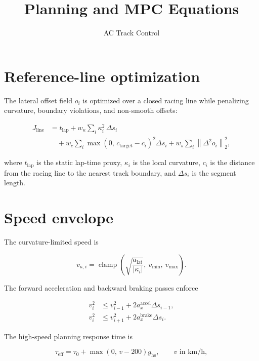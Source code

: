 \documentclass[9pt]{article}
\title{\vspace{-1.0cm}\textbf{Planning and MPC Equations}}
\author{AC Track Control}
\date{}
\begin{document}
\maketitle
\vspace{-0.5cm}
\small
{}

\section{Reference-line optimization}

The lateral offset field $o_i$ is optimized over a closed racing line while
penalizing curvature, boundary violations, and non-smooth offsets:

\begin{align}
J_{\mathrm{line}}
&= t_{\mathrm{lap}}
+ w_{\kappa}\sum_i \kappa_i^2\,\Delta s_i \nonumber\\
&\quad
+ w_c\sum_i
\max\!\left(0,\,c_{\mathrm{target}}-c_i\right)^2\Delta s_i
+ w_s\sum_i \left\|\Delta^2 o_i\right\|_2^2,
\label{eq:line-cost}
\end{align}

where $t_{\mathrm{lap}}$ is the static lap-time proxy, $\kappa_i$ is the local
curvature, $c_i$ is the distance from the racing line to the nearest track
boundary, and $\Delta s_i$ is the segment length.

\section{Speed envelope}

The curvature-limited speed is

\begin{equation}
v_{\kappa,i}
=
\operatorname{clamp}\!\left(
\sqrt{\frac{a_{\mathrm{lat}}}{|\kappa_i|}},
\ v_{\min},
\ v_{\max}
\right).
\label{eq:curvature-speed}
\end{equation}

The forward acceleration and backward braking passes enforce

\begin{align}
v_i^2 &\leq v_{i-1}^2 + 2a_x^{\mathrm{accel}}\Delta s_{i-1},
\label{eq:forward-pass}\\
v_i^2 &\leq v_{i+1}^2 + 2a_x^{\mathrm{brake}}\Delta s_i.
\label{eq:backward-pass}
\end{align}

The high-speed planning response time is

\begin{equation}
\tau_{\mathrm{eff}}
=
\tau_0
+ \max\!\left(0,\,v-200\right)g_{\mathrm{hs}},
\qquad
v \text{ in km/h},
\label{eq:high-speed-response}
\end{equation}
\end{document}
